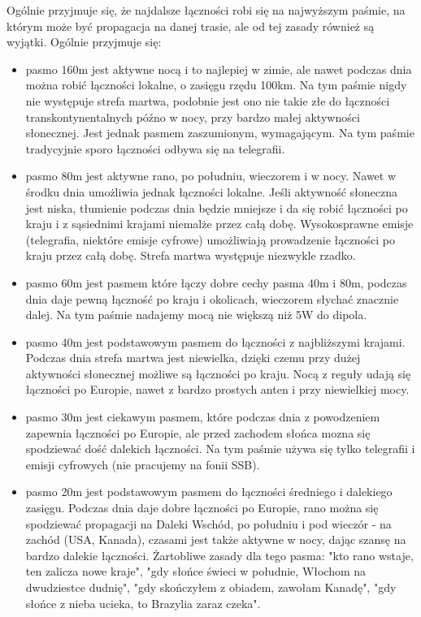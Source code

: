 \documentclass[a4paper,12pt]{article}
\begin{document}
Ogólnie przyjmuje się, że najdalsze łączności robi się na najwyższym paśmie, na którym może być propagacja na danej trasie, ale od tej zasady również są wyjątki. Ogólnie przyjmuje się:
\begin{itemize}
 \item pasmo 160m jest aktywne nocą i to najlepiej w zimie, ale nawet podczas dnia można robić łączności lokalne, o zasięgu rzędu 100km. Na tym paśmie nigdy nie występuje strefa martwa, podobnie jest ono nie takie złe do łączności transkontynentalnych późno w nocy, przy bardzo małej aktywności słonecznej. Jest jednak pasmem zaszumionym, wymagającym. Na tym paśmie tradycyjnie sporo łączności odbywa się na telegrafii.
 \item pasmo 80m jest aktywne rano, po południu, wieczorem i w nocy. Nawet w środku dnia umożliwia jednak łączności lokalne. Jeśli aktywność słoneczna jest niska, tłumienie podczas dnia będzie mniejsze i da się robić łączności po kraju i z sąsiednimi krajami niemalże przez całą dobę. Wysokosprawne emisje (telegrafia, niektóre emisje cyfrowe) umożliwiają prowadzenie łączności po kraju przez całą dobę. Strefa martwa występuje niezwykle rzadko.
\item pasmo 60m jest pasmem które łączy dobre cechy pasma 40m i 80m, podczas dnia daje pewną łączność po kraju i okolicach, wieczorem słychać znacznie dalej. Na tym paśmie nadajemy mocą nie większą niż 5W do dipola.
\item pasmo 40m jest podstawowym pasmem do łączności z najbliższymi krajami. Podczas dnia strefa martwa jest niewielka, dzięki czemu przy dużej aktywności słonecznej możliwe są łączności po kraju. Nocą z reguły udają się łączności po Europie, nawet z bardzo prostych anten i przy niewielkiej mocy.
 \item pasmo 30m jest ciekawym pasmem, które podczas dnia z powodzeniem zapewnia łączności po Europie, ale przed zachodem słońca mozna się spodziewać dość dalekich łączności. Na tym paśmie używa się tylko telegrafii i emisji cyfrowych (nie pracujemy na fonii SSB).
 \item pasmo 20m jest podstawowym pasmem do łączności średniego i dalekiego zasięgu. Podczas dnia daje dobre łączności po Europie, rano można się spodziewać propagacji na Daleki Wschód, po południu i pod wieczór - na zachód (USA, Kanada), czasami jest także aktywne w nocy, dając szansę na bardzo dalekie łączności. Żartobliwe zasady dla tego pasma: "kto rano wstaje, ten zalicza nowe kraje", "gdy słońce świeci w południe, Włochom na dwudziestce dudnię", "gdy skończyłem z obiadem, zawołam Kanadę", "gdy słońce z nieba ucieka, to Brazylia zaraz czeka".

\end{itemize}
\end{document}
